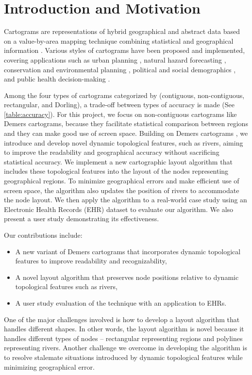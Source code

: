 \section{Introduction and Motivation}

Cartograms are representations of hybrid geographical and abstract data based on a value-by-area mapping technique combining statistical and geographical information \cite{dent2009Cartography}. Various styles of cartograms have been proposed and implemented, covering applications such as urban planning \cite{harris2018Mapping, arranz-lopez2021Enduser}, natural hazard forecasting \cite{pappenberger2019Cartograms, park2020Flood}, conservation and environmental planning \cite{galluzzi2018Mapping, rocchini2019Cartogramming}, political and social demographics \cite{breitzman2018Using, alieva2021How}, and public health decision-making \cite{gao2020Visualising, sack2021Visualizing}.

Among the four types of cartograms categorized by  (contiguous, non-contiguous, rectangular, and Dorling), a trade-off between types of accuracy is made (See \autoref{table:accuracy}). For this project, we focus on non-contiguous cartograms like Demers cartograms, because they facilitate statistical comparison between regions and they can make good use of screen space. Building on Demers cartograms \cite{ian2002Cartogram}, we introduce and develop novel dynamic topological features, such as rivers, aiming to improve the readability and geographical accuracy without sacrificing statistical accuracy. We implement a new cartographic layout algorithm that includes these topological features into the layout of the nodes representing geographical regions. To minimize geographical errors and make efficient use of screen space, the algorithm also updates the position of rivers to accommodate the node layout. We then apply the algorithm to a real-world case study using an Electronic Health Records (EHR) dataset to evaluate our algorithm. We also present a user study demonstrating its effectiveness.

Our contributions include:

\begin{itemize}
    \item A new variant of Demers cartograms that incorporates dynamic topological features to improve readability and recognizability,
    \item A novel layout algorithm that preserves node positions relative to dynamic topological features such as rivers,
    \item A user study evaluation of the technique with an application to EHRs.
\end{itemize}

One of the major challenges involved is how to develop a layout algorithm that handles different shapes. In other words, the layout algorithm is novel because it handles different types of nodes -- rectangular representing regions and polylines representing rivers. Another challenge we overcome in developing the algorithm is to resolve stalemate situations introduced by dynamic topological features while minimizing geographical error.